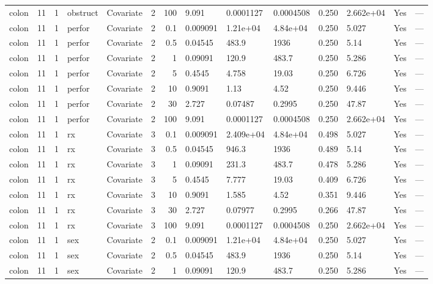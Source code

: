 \begin{tabular}{lrlllrrlllllll}
  colon & 11 & 1 & obstruct & Covariate & 2 &   100 & 9.091 & 0.0001127 & 0.0004508 & 0.250 & 2.662e+04 & Yes & --- \\ 
  colon & 11 & 1 & perfor & Covariate & 2 &   0.1 & 0.009091 & 1.21e+04 & 4.84e+04 & 0.250 & 5.027 & Yes & --- \\ 
  colon & 11 & 1 & perfor & Covariate & 2 &   0.5 & 0.04545 & 483.9 & 1936 & 0.250 & 5.14 & Yes & --- \\ 
  colon & 11 & 1 & perfor & Covariate & 2 &     1 & 0.09091 & 120.9 & 483.7 & 0.250 & 5.286 & Yes & --- \\ 
  colon & 11 & 1 & perfor & Covariate & 2 &     5 & 0.4545 & 4.758 & 19.03 & 0.250 & 6.726 & Yes & --- \\ 
  colon & 11 & 1 & perfor & Covariate & 2 &    10 & 0.9091 & 1.13 & 4.52 & 0.250 & 9.446 & Yes & --- \\ 
  colon & 11 & 1 & perfor & Covariate & 2 &    30 & 2.727 & 0.07487 & 0.2995 & 0.250 & 47.87 & Yes & --- \\ 
  colon & 11 & 1 & perfor & Covariate & 2 &   100 & 9.091 & 0.0001127 & 0.0004508 & 0.250 & 2.662e+04 & Yes & --- \\ 
  colon & 11 & 1 & rx & Covariate & 3 &   0.1 & 0.009091 & 2.409e+04 & 4.84e+04 & 0.498 & 5.027 & Yes & --- \\ 
  colon & 11 & 1 & rx & Covariate & 3 &   0.5 & 0.04545 & 946.3 & 1936 & 0.489 & 5.14 & Yes & --- \\ 
  colon & 11 & 1 & rx & Covariate & 3 &     1 & 0.09091 & 231.3 & 483.7 & 0.478 & 5.286 & Yes & --- \\ 
  colon & 11 & 1 & rx & Covariate & 3 &     5 & 0.4545 & 7.777 & 19.03 & 0.409 & 6.726 & Yes & --- \\ 
  colon & 11 & 1 & rx & Covariate & 3 &    10 & 0.9091 & 1.585 & 4.52 & 0.351 & 9.446 & Yes & --- \\ 
  colon & 11 & 1 & rx & Covariate & 3 &    30 & 2.727 & 0.07977 & 0.2995 & 0.266 & 47.87 & Yes & --- \\ 
  colon & 11 & 1 & rx & Covariate & 3 &   100 & 9.091 & 0.0001127 & 0.0004508 & 0.250 & 2.662e+04 & Yes & --- \\ 
  colon & 11 & 1 & sex & Covariate & 2 &   0.1 & 0.009091 & 1.21e+04 & 4.84e+04 & 0.250 & 5.027 & Yes & --- \\ 
  colon & 11 & 1 & sex & Covariate & 2 &   0.5 & 0.04545 & 483.9 & 1936 & 0.250 & 5.14 & Yes & --- \\ 
  colon & 11 & 1 & sex & Covariate & 2 &     1 & 0.09091 & 120.9 & 483.7 & 0.250 & 5.286 & Yes & --- \\ 

\end{tabular}
